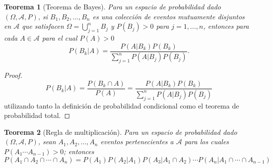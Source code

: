 \documentclass[12pt]{article}
\newtheorem{theorem}{Teorema}[section]
\begin{document}
\begin{theorem}[Teorema de Bayes]
    Para un espacio de probabilidad dado $(\Omega, \mathscr A, P)$, si $B_1, B_2, \ldots, B_n$ es una colección de eventos mutuamente disjuntos en $\mathscr A$ que satisfacen $\Omega=\bigcup\limits_{j=1}^n B_j$ y $P(B_j)>0$ para $j=1,\ldots, n$, entonces para cada $A\in\mathscr A$ para el cual $P(A)>0$
    $$P(B_k|A)= \frac{P(A|B_k)P(B_k)}{\sum\limits_{j=1}^n P(A|B_j)P(B_j)}.$$
\end{theorem}
\begin{proof}
    $$P(B_k|A)= \frac{P(B_k\cap A)}{P(A)}=\frac{P(A|B_k)P(B_k)}{\sum\limits_{j=1}^n P(A|B_j)P(B_j)}$$
    utilizando tanto la definición de probabilidad condicional como el teorema de probabilidad total.
\end{proof}

\begin{theorem}[Regla de multiplicación]
    Para un espacio de probabilidad dado $(\Omega, \mathscr A, P)$, sean $A_1, A_2, \ldots, A_n$ eventos pertenecientes a $\mathscr A$ para los cuales $P(A_1\cdots A_{n-1})>0$; entonces
    $$P(A_1\cap A_2\cap \cdots\cap A_n)= P(A_1)P(A_2|A_1)P(A_3|A_1\cap A_2)\cdots P(A_n|A_1\cap \cdots\cap A_{n-1})$$
\end{theorem}
\end{document}
